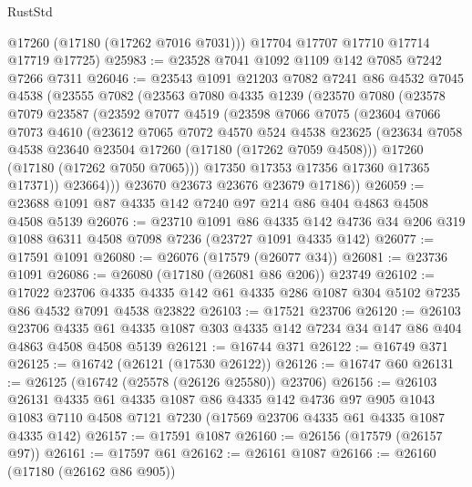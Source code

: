 \begin{lexlean}{RustStd}
\begin{coremodule}
        @17260
        (@17180 (@17262 @7016 @7031)))
      @17704
      @17707
      @17710
      @17714
      @17719
      @17725)
@25983 := @23528 @7041 @1092 @1109 @142 @7085 @7242 @7266 @7311
@26046 := @23543
    @1091
    @21203
    @7082
    @7241
    @86
    @4532
    @7045
    @4538
    (@23555
      @7082
      (@23563
        @7080
        @4335
        @1239
        (@23570
          @7080
          (@23578
            @7079
            @23587
            (@23592
              @7077
              @4519
              (@23598
                @7066
                @7075
                (@23604
                  @7066
                  @7073
                  @4610
                  (@23612
                    @7065
                    @7072
                    @4570
                    @524
                    @4538
                    @23625
                    (@23634 @7058 @4538 @23640 @23504 @17260 (@17180 (@17262 @7059 @4508)))
                    @17260
                    (@17180 (@17262 @7050 @7065)))
                  @17350
                  @17353
                  @17356
                  @17360
                  @17365
                  @17371))
              @23664)))
        @23670
        @23673
        @23676
        @23679
        @17186))
@26059 := @23688 @1091 @87 @4335 @142 @7240 @97 @214 @86 @404 @4863 @4508 @4508 @5139
@26076 := @23710
    @1091
    @86
    @4335
    @142
    @4736
    @34
    @206
    @319
    @1088
    @6311
    @4508
    @7098
    @7236
    (@23727 @1091 @4335 @142)
@26077 := @17591 @1091
@26080 := @26076 (@17579 (@26077 @34))
@26081 := @23736 @1091
@26086 := @26080 (@17180 (@26081 @86 @206)) @23749
@26102 := @17022
    @23706
    @4335
    @4335
    @142
    @61
    @4335
    @286
    @1087
    @304
    @5102
    @7235
    @86
    @4532
    @7091
    @4538
    @23822
@26103 := @17521 @23706
@26120 := @26103
    @23706
    @4335
    @61
    @4335
    @1087
    @303
    @4335
    @142
    @7234
    @34
    @147
    @86
    @404
    @4863
    @4508
    @4508
    @5139
@26121 := @16744 @371
@26122 := @16749 @371
@26125 := @16742 (@26121 (@17530 @26122))
@26126 := @16747 @60
@26131 := @26125 (@16742 (@25578 (@26126 @25580)) @23706)
@26156 := @26103
    @26131
    @4335
    @61
    @4335
    @1087
    @86
    @4335
    @142
    @4736
    @97
    @905
    @1043
    @1083
    @7110
    @4508
    @7121
    @7230
    (@17569 @23706 @4335 @61 @4335 @1087 @4335 @142)
@26157 := @17591 @1087
@26160 := @26156 (@17579 (@26157 @97))
@26161 := @17597 @61
@26162 := @26161 @1087
@26166 := @26160 (@17180 (@26162 @86 @905))

\end{coremodule}
\end{lexlean}

